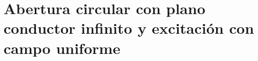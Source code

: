 
\section{Abertura circular con plano conductor infinito y excitación con campo uniforme}
\label{subsec_apendice_c_abert_circ_inf_uni}

